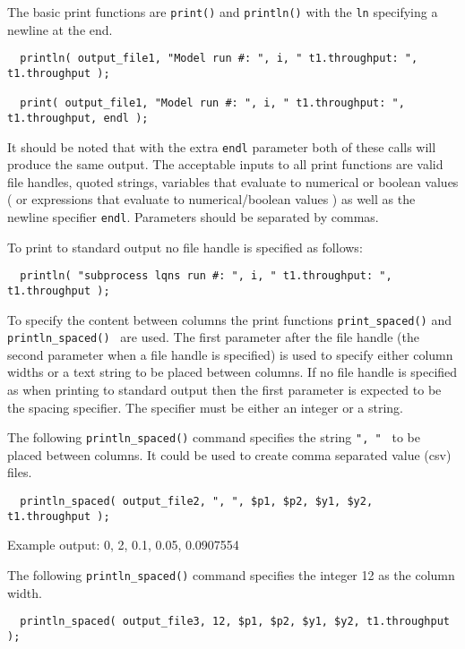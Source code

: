The basic print functions are {\tt print()} and {\tt println()} with the {\tt ln} specifying a newline at the end.

\lstset{language=LQX}
\begin{lstlisting}
  println( output_file1, "Model run #: ", i, " t1.throughput: ", t1.throughput );

  print( output_file1, "Model run #: ", i, " t1.throughput: ", t1.throughput, endl );
\end{lstlisting}

It should be noted that with the extra {\tt endl} parameter both of these calls will produce the same output.
The acceptable inputs to all print functions are valid file handles, quoted strings, \ModLang variables that
evaluate to numerical or boolean values ( or expressions that evaluate to numerical/boolean values ) as well
as the newline specifier {\tt endl}. Parameters should be separated by commas.

To print to standard output no file handle is specified as follows:

\lstset{language=LQX}
\begin{lstlisting}
  println( "subprocess lqns run #: ", i, " t1.throughput: ", t1.throughput );
\end{lstlisting}

To specify the content between columns the print functions {\tt print\_spaced()} and {\tt println\_spaced() }
are used. The first parameter after the file handle (the second parameter when a file handle is specified) is
used to specify either column widths or a text string to be placed between columns. If no file handle is specified
as when printing to standard output then the first parameter is expected to be the spacing specifier. The specifier
must be either an integer or a string.

The following {\tt println\_spaced()} command specifies the string {\tt ", " } to be placed between columns. It could be used
to create comma separated value (csv) files.

\lstset{language=LQX}
\begin{lstlisting}
  println_spaced( output_file2, ", ", $p1, $p2, $y1, $y2, t1.throughput );
\end{lstlisting}

Example output: 0, 2, 0.1, 0.05, 0.0907554

The following {\tt println\_spaced()} command specifies the integer 12 as the column width.

\lstset{language=LQX}
\begin{lstlisting}
  println_spaced( output_file3, 12, $p1, $p2, $y1, $y2, t1.throughput );
\end{lstlisting}

